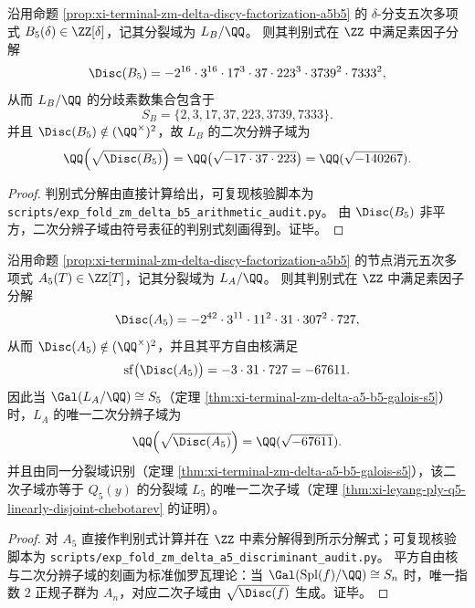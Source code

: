 \begin{conclusion}\label{con:xi-terminal-zm-delta-b5-discriminant-ramification-quadratic}
沿用命题 \ref{prop:xi-terminal-zm-delta-discy-factorization-a5b5} 的 \(\delta\)-分支五次多项式 \(B_5(\delta)\in\ZZ[\delta]\)，记其分裂域为 \(L_B/\QQ\)。
则其判别式在 \(\ZZ\) 中满足素因子分解
\[
\Disc(B_5)
=-2^{16}\cdot 3^{16}\cdot 17^{3}\cdot 37\cdot 223^{3}\cdot 3739^{2}\cdot 7333^{2},
\]
从而 \(L_B/\QQ\) 的分歧素数集合包含于
\[
S_B=\{2,3,17,37,223,3739,7333\}.
\]
并且 \(\Disc(B_5)\notin(\QQ^\times)^2\)，故 \(L_B\) 的二次分辨子域为
\[
\QQ\!\left(\sqrt{\Disc(B_5)}\right)
=\QQ\!\left(\sqrt{-17\cdot 37\cdot 223}\right)
=\QQ(\sqrt{-140267}).
\]
\end{conclusion}
\begin{proof}
判别式分解由直接计算给出，可复现核验脚本为 \texttt{scripts/exp\_fold\_zm\_delta\_b5\_arithmetic\_audit.py}。
由 \(\Disc(B_5)\) 非平方，二次分辨子域由符号表征的判别式刻画得到。证毕。
\end{proof}

\begin{conclusion}[节点消元五次的判别式全素分解与二次分辨子域]\label{con:xi-terminal-zm-delta-a5-discriminant-quadratic}
沿用命题 \ref{prop:xi-terminal-zm-delta-discy-factorization-a5b5} 的节点消元五次多项式 \(A_5(T)\in\ZZ[T]\)，记其分裂域为 \(L_A/\QQ\)。
则其判别式在 \(\ZZ\) 中满足素因子分解
\[
\Disc(A_5)=-2^{42}\cdot 3^{11}\cdot 11^{2}\cdot 31\cdot 307^{2}\cdot 727,
\]
从而 \(\Disc(A_5)\notin(\QQ^\times)^2\)，并且其平方自由核满足
\[
\mathrm{sf}\bigl(\Disc(A_5)\bigr)=-3\cdot 31\cdot 727=-67611.
\]
因此当 \(\Gal(L_A/\QQ)\cong S_5\)（定理 \ref{thm:xi-terminal-zm-delta-a5-b5-galois-s5}）时，\(L_A\) 的唯一二次分辨子域为
\[
\QQ\!\left(\sqrt{\Disc(A_5)}\right)=\QQ(\sqrt{-67611}).
\]
并且由同一分裂域识别（定理 \ref{thm:xi-terminal-zm-delta-a5-b5-galois-s5}），该二次子域亦等于 \(Q_5(y)\) 的分裂域 \(L_5\) 的唯一二次子域（定理 \ref{thm:xi-leyang-ply-q5-linearly-disjoint-chebotarev} 的证明）。
\end{conclusion}
\begin{proof}
对 \(A_5\) 直接作判别式计算并在 \(\ZZ\) 中素分解得到所示分解式；可复现核验脚本为 \texttt{scripts/exp\_fold\_zm\_delta\_a5\_discriminant\_audit.py}。
平方自由核与二次分辨子域的刻画为标准伽罗瓦理论：当 \(\Gal(\mathrm{Spl}(f)/\QQ)\cong S_n\) 时，唯一指数 \(2\) 正规子群为 \(A_n\)，对应二次子域由 \(\sqrt{\Disc(f)}\) 生成。证毕。
\end{proof}

